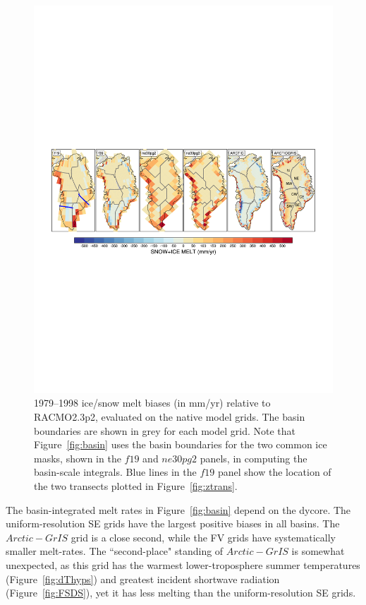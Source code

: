\documentclass[draft]{agujournal2019}
\begin{document}
\begin{figure}[t]
\begin{center}
         \includegraphics[width=130mm]{figs/temp_contours_diffRACMO_melt.pdf}
\end{center}
\caption{1979--1998 ice/snow melt biases (in mm/yr) relative to RACMO2.3p2, evaluated on the native model grids. The  basin boundaries are shown in grey for each model grid. Note that Figure~\ref{fig:basin} uses the basin boundaries for the two common ice masks, shown in the $f19$ and $ne30pg2$ panels, in computing the basin-scale integrals. Blue lines in the $f19$ panel show the location of the two transects plotted in Figure~\ref{fig:ztrans}.}
\label{fig:melt}
\end{figure}

The basin-integrated melt rates in Figure~\ref{fig:basin} depend on the dycore. The uniform-resolution SE grids have the largest positive biases in all basins. The $Arctic-GrIS$ grid is a close second, while the FV grids have systematically smaller melt-rates. The ``second-place" standing of $Arctic-GrIS$ is somewhat unexpected, as this grid has the warmest lower-troposphere summer temperatures (Figure~\ref{fig:dThyps}) and greatest incident shortwave radiation (Figure~\ref{fig:FSDS}), yet it has less melting than the uniform-resolution SE grids.
\end{document}

